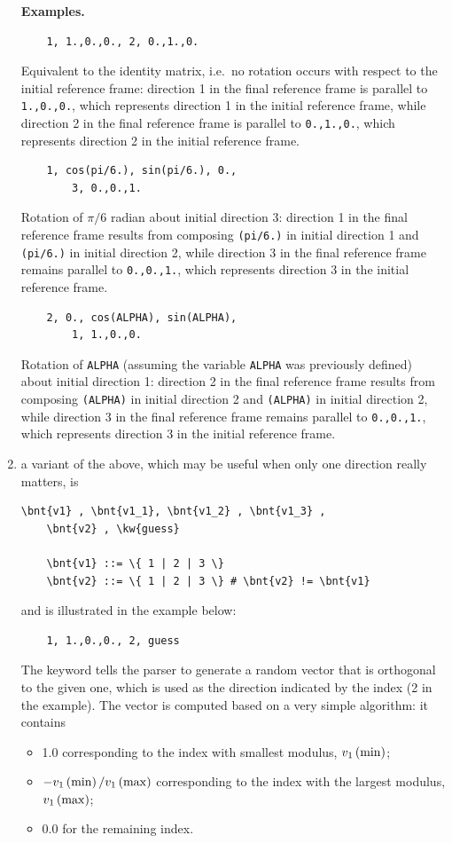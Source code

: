 \begin{enumerate}
\noindent
\textbf{Examples.}
\begin{verbatim}
    1, 1.,0.,0., 2, 0.,1.,0.
\end{verbatim}
Equivalent to the identity matrix, i.e.\ no rotation 
occurs with respect to the initial reference frame: direction 1
in the final reference frame is parallel to \texttt{1.,0.,0.}, which represents
direction 1 in the initial reference frame, while direction 2 in the final reference frame
is parallel to \texttt{0.,1.,0.}, which represents direction 2
in the initial reference frame.
\begin{verbatim}
    1, cos(pi/6.), sin(pi/6.), 0.,
        3, 0.,0.,1.
\end{verbatim}
Rotation of $ \pi/6 $ radian about
initial direction 3: direction 1 in the final reference frame results from 
composing \texttt{(pi/6.)} in initial direction 1
and \texttt{(pi/6.)}
in initial direction 2, while direction 3 in the final reference frame remains
parallel to \texttt{0.,0.,1.}, which represents direction 3 in the initial reference frame.
\begin{verbatim}
    2, 0., cos(ALPHA), sin(ALPHA),
        1, 1.,0.,0.
\end{verbatim}
Rotation of \texttt{ALPHA} (assuming the variable \texttt{ALPHA} was previously defined) about
initial direction 1: direction 2 in the final reference frame results from 
composing \texttt{(ALPHA)} in initial direction 2
and \texttt{(ALPHA)}
in initial direction 2, while direction 3 in the final reference frame remains
parallel to \texttt{0.,0.,1.}, which represents direction 3 in the initial reference frame.

\item a variant of the above, which may be useful when only one
direction really matters, is
\begin{Verbatim}[commandchars=\\\{\}]
    \bnt{v1} , \bnt{v1_1}, \bnt{v1_2} , \bnt{v1_3} ,
    \bnt{v2} , \kw{guess}

    \bnt{v1} ::= \{ 1 | 2 | 3 \}
    \bnt{v2} ::= \{ 1 | 2 | 3 \} # \bnt{v2} != \bnt{v1}
\end{Verbatim}
and is illustrated in the example below:
\begin{verbatim}
    1, 1.,0.,0., 2, guess
\end{verbatim}
The keyword  tells the parser to generate a random vector
that is orthogonal to the given one, which is used as the direction
indicated by the index (2 in the example).
The vector is computed based on a very simple algorithm: it contains
\begin{itemize}
        \item 1.0 corresponding to the index with smallest modulus,
        $v_1\left( \mathrm{min} \right)$;
	\item $-v_1\left( \mathrm{min} \right)/v_1\left( \mathrm{max} \right)$
	corresponding to the index with the largest modulus,
	$v_1\left( \mathrm{max} \right)$;
	\item 0.0 for the remaining index.
\end{itemize}


\end{enumerate}
